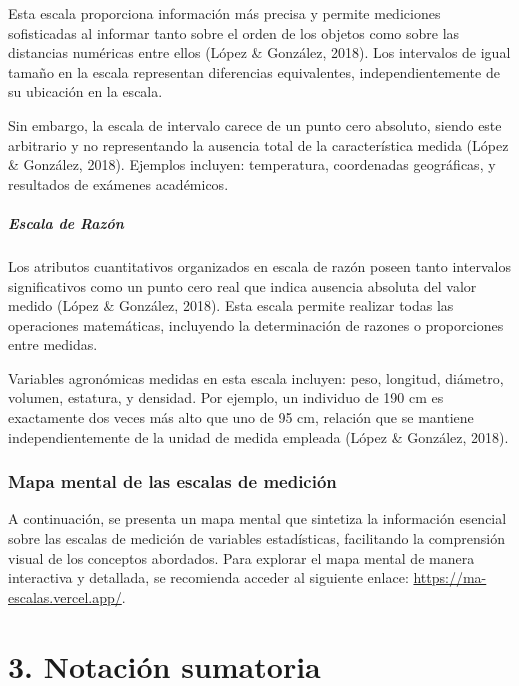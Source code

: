 \documentclass[
  spanish,
  letterpaper,
]{book}
\begin{document}
Esta escala proporciona información más precisa y permite mediciones
sofisticadas al informar tanto sobre el orden de los objetos como sobre
las distancias numéricas entre ellos (López \& González, 2018). Los
intervalos de igual tamaño en la escala representan diferencias
equivalentes, independientemente de su ubicación en la escala.

Sin embargo, la escala de intervalo carece de un punto cero absoluto,
siendo este arbitrario y no representando la ausencia total de la
característica medida (López \& González, 2018). Ejemplos incluyen:
temperatura, coordenadas geográficas, y resultados de exámenes
académicos.

\subsubsection{Escala de Razón}\label{escala-de-razuxf3n}

Los atributos cuantitativos organizados en escala de razón poseen tanto
intervalos significativos como un punto cero real que indica ausencia
absoluta del valor medido (López \& González, 2018). Esta escala permite
realizar todas las operaciones matemáticas, incluyendo la determinación
de razones o proporciones entre medidas.

Variables agronómicas medidas en esta escala incluyen: peso, longitud,
diámetro, volumen, estatura, y densidad. Por ejemplo, un individuo de
190 cm es exactamente dos veces más alto que uno de 95 cm, relación que
se mantiene independientemente de la unidad de medida empleada (López \&
González, 2018).

\section{Mapa mental de las escalas de
medición}\label{mapa-mental-de-las-escalas-de-mediciuxf3n}

A continuación, se presenta un mapa mental que sintetiza la información
esencial sobre las escalas de medición de variables estadísticas,
facilitando la comprensión visual de los conceptos abordados. Para
explorar el mapa mental de manera interactiva y detallada, se recomienda
acceder al siguiente enlace: \url{https://ma-escalas.vercel.app/}.

\part{3. Notación sumatoria}

\end{document}
